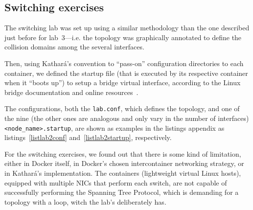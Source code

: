 \subsection{Switching exercises}

The switching lab was set up using a similar methodology than the one described just before for lab~3---i.e. the topology was graphically annotated to define the collision domains among the several interfaces.

Then, using Kathará's convention to ``pass-on'' configuration directories to each container, we defined the startup file (that is executed by its respective container when it ``boots up'') to setup a bridge virtual interface, according to the Linux bridge documentation and online resources~\cite{brctlman,howtobridgelinux}.

The configurations, both the \texttt{lab.conf}, which defines the topology, and one of the nine (the other ones are analogous and only vary in the number of interfaces) \texttt{<node\_name>.startup}, are shown as examples in the listings appendix as listings~\ref{listlab2conf} and~\ref{listlab2startup}, respectively.

For the switching exercises, we found out that there is some kind of limitation, either in Docker itself, in Docker's chosen intercontainer networking strategy, or in Kathará's implementation.
The containers (lightweight virtual Linux hosts), equipped with multiple NICs that perform each switch, are not capable of successfully performing the Spanning Tree Protocol, which is demanding for a topology with a loop, witch the lab's deliberately has.  %

